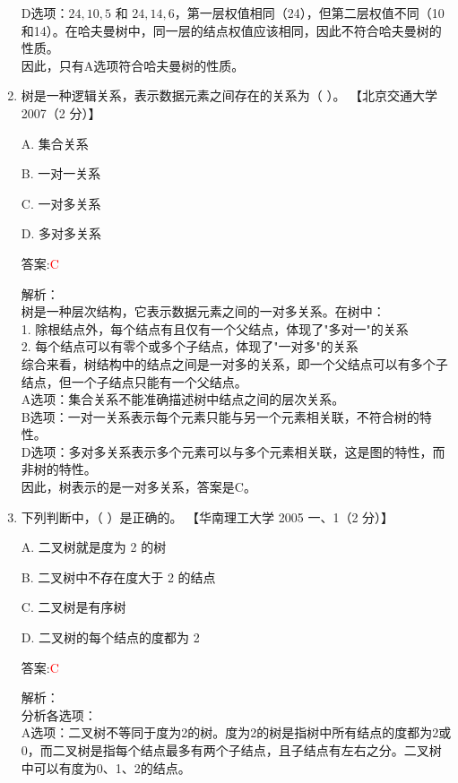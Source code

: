 \documentclass[lang=cn,newtx,10pt,scheme=chinese]{../../../elegantbook}
\begin{document}
\begin{enumerate}
    D选项：$24, 10, 5$ 和 $24, 14, 6$，第一层权值相同（24），但第二层权值不同（10和14）。在哈夫曼树中，同一层的结点权值应该相同，因此不符合哈夫曼树的性质。\\
    
    因此，只有A选项符合哈夫曼树的性质。\\  
    

    \item 树是一种逻辑关系，表示数据元素之间存在的关系为（ ）。  
    【北京交通大学 2007（2 分）】  

    A. 集合关系  

    B. 一对一关系  

    C. 一对多关系  

    D. 多对多关系  
    
    答案:\textcolor{red}{C}
    
    解析：\\
    树是一种层次结构，它表示数据元素之间的一对多关系。在树中：\\
    1. 除根结点外，每个结点有且仅有一个父结点，体现了"多对一"的关系\\
    2. 每个结点可以有零个或多个子结点，体现了"一对多"的关系\\
    
    综合来看，树结构中的结点之间是一对多的关系，即一个父结点可以有多个子结点，但一个子结点只能有一个父结点。\\
    
    A选项：集合关系不能准确描述树中结点之间的层次关系。\\
    B选项：一对一关系表示每个元素只能与另一个元素相关联，不符合树的特性。\\
    D选项：多对多关系表示多个元素可以与多个元素相关联，这是图的特性，而非树的特性。\\
    
    因此，树表示的是一对多关系，答案是C。\\  

    \item 下列判断中，（ ）是正确的。  
    【华南理工大学 2005 一、1（2 分）】  

    A. 二叉树就是度为 2 的树  

    B. 二叉树中不存在度大于 2 的结点  

    C. 二叉树是有序树  

    D. 二叉树的每个结点的度都为 2  
    
    答案:\textcolor{red}{C}
    
    解析：\\
    分析各选项：\\
    A选项：二叉树不等同于度为2的树。度为2的树是指树中所有结点的度都为2或0，而二叉树是指每个结点最多有两个子结点，且子结点有左右之分。二叉树中可以有度为0、1、2的结点。\\
    

\end{enumerate}
\end{document}
